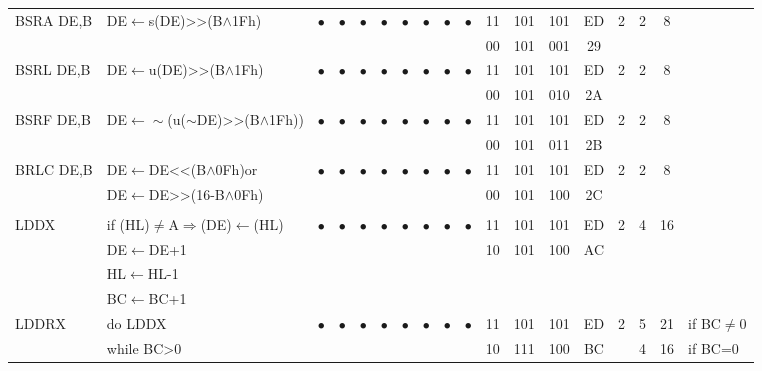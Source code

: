 \documentclass[oneside,a4paper]{book}
\begin{document}
{\begin{tabular}{llcccccccccccccccl}
		BSRA DE,B\instrt & 
			DE$\leftarrow$s(DE)>>(B$\wedge$1Fh)\footnotemark[2] & 
			$\bullet$ & 
				$\bullet$ & 
				$\bullet$ & 
				$\bullet$ & 
				$\bullet$ & 
				$\bullet$ & 
				$\bullet$ & 
				$\bullet$ & 
			11 & 101 & 101 & 
			ED & 2 & 
			2 & 8 & \\
			\multicolumn{10}{c}{} & 00 & 101 & 001 & 29 & \instrb \\

		BSRL DE,B\instrt & 
			DE$\leftarrow$u(DE)>>(B$\wedge$1Fh)\footnotemark[3] & 
			$\bullet$ & 
				$\bullet$ & 
				$\bullet$ & 
				$\bullet$ & 
				$\bullet$ & 
				$\bullet$ & 
				$\bullet$ & 
				$\bullet$ & 
			11 & 101 & 101 & 
			ED & 2 & 
			2 & 8 & \\
			\multicolumn{10}{c}{} & 00 & 101 & 010 & 2A & \instrb \\

		BSRF DE,B\instrt & 
			DE$\leftarrow\sim$(u($\sim$DE)>>(B$\wedge$1Fh))\footnotemark[4] & 
			$\bullet$ & 
				$\bullet$ & 
				$\bullet$ & 
				$\bullet$ & 
				$\bullet$ & 
				$\bullet$ & 
				$\bullet$ & 
				$\bullet$ & 
			11 & 101 & 101 & 
			ED & 2 & 
			2 & 8 & \\
			\multicolumn{10}{c}{} & 00 & 101 & 011 & 2B & \instrb \\
			
		BRLC DE,B\instrt & 
			DE$\leftarrow$DE<<(B$\wedge$0Fh)\footnotemark[5] or & 
			$\bullet$ & 
				$\bullet$ & 
				$\bullet$ & 
				$\bullet$ & 
				$\bullet$ & 
				$\bullet$ & 
				$\bullet$ & 
				$\bullet$ & 
			11 & 101 & 101 & 
			ED & 2 & 
			2 & 8 & \\
			& DE$\leftarrow$DE>>(16-B$\wedge$0Fh) & \multicolumn{8}{c}{} & 00 & 101 & 100 & 2C & \instrb \\

		& & & & & & & & & & & & & & & & & \\
	
		LDDX\instrt & 
			if (HL)$\neq$A$\Rightarrow$(DE)$\leftarrow$(HL) & 
			$\bullet$ & 
				$\bullet$ & 
				$\bullet$ & 
				$\bullet$ & 
				$\bullet$ & 
				$\bullet$ & 
				$\bullet$ & 
				$\bullet$ & 
			11 & 101 & 101 & 
			ED & 2 & 
			4 & 16 & \\
			& DE$\leftarrow$DE+1 & \multicolumn{8}{c}{} & 10 & 101 & 100 & AC & \\
			& HL$\leftarrow$HL-1 & \\
			& BC$\leftarrow$BC+1 & \instrb \\
	
		LDDRX\instrt & 
			do LDDX & 
			$\bullet$ & 
				$\bullet$ & 
				$\bullet$ & 
				$\bullet$ & 
				$\bullet$ & 
				$\bullet$ & 
				$\bullet$ & 
				$\bullet$ & 
			11 & 101 & 101 & 
			ED & 2 & 
			5 & 21 & if BC$\neq$0 \\
			& while BC>0 & \multicolumn{8}{c}{} & 10 & 111 & 100 & BC & & 4 & 16 & if BC=0 \instrb \\
	

\end{tabular}}
\end{document}
